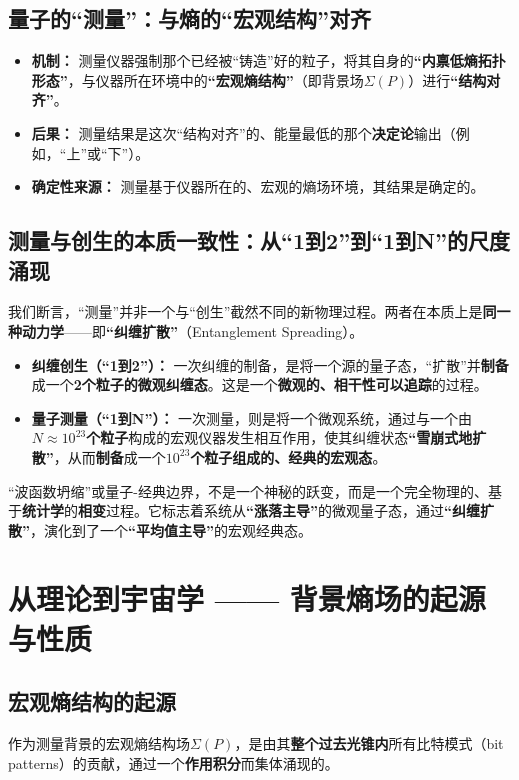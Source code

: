 \documentclass[12pt]{article}
\begin{document}
\subsection{量子的``测量''：与熵的``宏观结构''对齐}
\begin{itemize}
    \item   \textbf{机制：} 测量仪器强制那个已经被``铸造''好的粒子，将其自身的\textbf{``内禀低熵拓扑形态''}，与仪器所在环境中的\textbf{``宏观熵结构''}（即背景场$\Sigma(P)$）进行\textbf{``结构对齐''}。
    \item   \textbf{后果：} 测量结果是这次``结构对齐''的、能量最低的那个\textbf{决定论}输出（例如，``上''或``下''）。
    \item   \textbf{确定性来源：} 测量基于仪器所在的、宏观的熵场环境，其结果是确定的。
\end{itemize}

\subsection{测量与创生的本质一致性：从``1到2''到``1到N''的尺度涌现}
我们断言，``测量''并非一个与``创生''截然不同的新物理过程。两者在本质上是\textbf{同一种动力学}——即\textbf{``纠缠扩散''}（Entanglement Spreading）。

\begin{itemize}
    \item   \textbf{纠缠创生（``1到2''）：} 一次纠缠的制备，是将一个源的量子态，``扩散''并\textbf{制备}成一个\textbf{2个粒子的微观纠缠态}。这是一个\textbf{微观的、相干性可以追踪}的过程。
    \item   \textbf{量子测量（``1到N''）：} 一次测量，则是将一个微观系统，通过与一个由\textbf{$N \approx 10^{23}$个粒子}构成的宏观仪器发生相互作用，使其纠缠状态\textbf{``雪崩式地扩散''}，从而\textbf{制备}成一个\textbf{$10^{23}$个粒子组成的、经典的宏观态}。
\end{itemize}

\noindent ``波函数坍缩''或量子-经典边界，不是一个神秘的跃变，而是一个完全物理的、基于\textbf{统计学}的\textbf{相变}过程。它标志着系统从\textbf{``涨落主导''}的微观量子态，通过\textbf{``纠缠扩散''}，演化到了一个\textbf{``平均值主导''}的宏观经典态。


\section{从理论到宇宙学 —— 背景熵场的起源与性质}

\subsection{宏观熵结构的起源}
作为测量背景的宏观熵结构场$\Sigma(P)$，是由其\textbf{整个过去光锥内}所有比特模式（bit patterns）的贡献，通过一个\textbf{作用积分}而集体涌现的。
\end{document}
